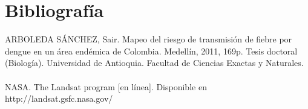 \documentclass[11pt, oneside]{article}
\theoremstyle{definition}
\theoremstyle{remark}
\begin{document}
\section{Bibliografía}
ARBOLEDA SÁNCHEZ, Sair. Mapeo del riesgo de transmisión de fiebre por dengue en un área endémica de Colombia. Medellín, 2011, 169p. Tesis doctoral (Biología). Universidad de Antioquia. Facultad de Ciencias Exactas y Naturales. \\ \quad \\
NASA. The Landsat program [en línea]. Disponible en http://landsat.gsfc.nasa.gov/
\end{document}
